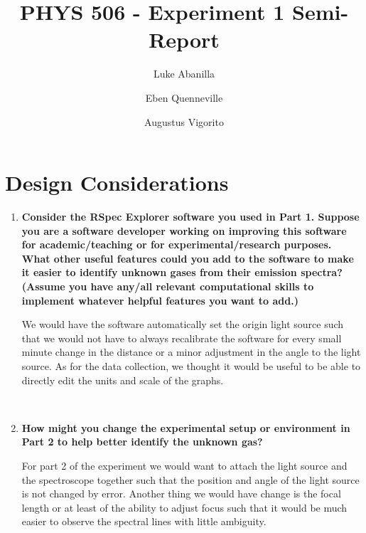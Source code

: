 \documentclass[prX,nofootinbib,notitlepage,12pt]{revtex4-1}
\begin{document}





\title{PHYS 506 - Experiment 1 Semi-Report}

\author{Luke Abanilla}%
\author{Eben Quenneville}
\author{Augustus Vigorito}

\maketitle

\section{Design Considerations}

\begin{enumerate}[label=(\alph*)]
    \item \textbf{Consider the RSpec Explorer software you used in Part 1. Suppose you are a software
developer working on improving this software for academic/teaching or for experimental/research purposes. What other useful features could you add to the software to
make it easier to identify unknown gases from their emission spectra? (Assume you
have any/all relevant computational skills to implement whatever helpful features you
want to add.)}

We would have the software automatically set the origin light source such that we would not have to always recalibrate the software for every small minute change in the distance or a minor adjustment in the angle to the light source. As for the data collection, we thought it would be useful to be able to directly edit the units and scale of the graphs.

\

    \item \textbf{How might you change the experimental setup or environment in Part 2 to help better
identify the unknown gas?}


For part 2 of the experiment we would want to attach the light source and the spectroscope together such that the position and angle of the light source is not changed by error. Another thing we would have change is the focal length or at least of the ability to adjust focus such that it would be much easier to observe the spectral lines with little ambiguity.

\end{enumerate}
\end{document}
